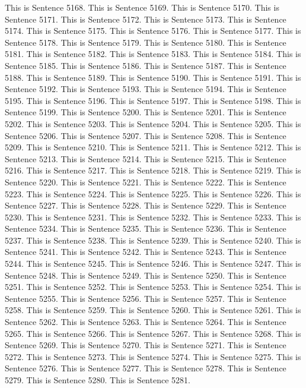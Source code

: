 \documentclass{article}
\begin{document}
This is Sentence 5168.
This is Sentence 5169.
This is Sentence 5170.
This is Sentence 5171.
This is Sentence 5172.
This is Sentence 5173.
This is Sentence 5174.
This is Sentence 5175.
This is Sentence 5176.
This is Sentence 5177.
This is Sentence 5178.
This is Sentence 5179.
This is Sentence 5180.
This is Sentence 5181.
This is Sentence 5182.
This is Sentence 5183.
This is Sentence 5184.
This is Sentence 5185.
This is Sentence 5186.
This is Sentence 5187.
This is Sentence 5188.
This is Sentence 5189.
This is Sentence 5190.
This is Sentence 5191.
This is Sentence 5192.
This is Sentence 5193.
This is Sentence 5194.
This is Sentence 5195.
This is Sentence 5196.
This is Sentence 5197.
This is Sentence 5198.
This is Sentence 5199.
This is Sentence 5200.
This is Sentence 5201.
This is Sentence 5202.
This is Sentence 5203.
This is Sentence 5204.
This is Sentence 5205.
This is Sentence 5206.
This is Sentence 5207.
This is Sentence 5208.
This is Sentence 5209.
This is Sentence 5210.
This is Sentence 5211.
This is Sentence 5212.
This is Sentence 5213.
This is Sentence 5214.
This is Sentence 5215.
This is Sentence 5216.
This is Sentence 5217.
This is Sentence 5218.
This is Sentence 5219.
This is Sentence 5220.
This is Sentence 5221.
This is Sentence 5222.
This is Sentence 5223.
This is Sentence 5224.
This is Sentence 5225.
This is Sentence 5226.
This is Sentence 5227.
This is Sentence 5228.
This is Sentence 5229.
This is Sentence 5230.
This is Sentence 5231.
This is Sentence 5232.
This is Sentence 5233.
This is Sentence 5234.
This is Sentence 5235.
This is Sentence 5236.
This is Sentence 5237.
This is Sentence 5238.
This is Sentence 5239.
This is Sentence 5240.
This is Sentence 5241.
This is Sentence 5242.
This is Sentence 5243.
This is Sentence 5244.
This is Sentence 5245.
This is Sentence 5246.
This is Sentence 5247.
This is Sentence 5248.
This is Sentence 5249.
This is Sentence 5250.
This is Sentence 5251.
This is Sentence 5252.
This is Sentence 5253.
This is Sentence 5254.
This is Sentence 5255.
This is Sentence 5256.
This is Sentence 5257.
This is Sentence 5258.
This is Sentence 5259.
This is Sentence 5260.
This is Sentence 5261.
This is Sentence 5262.
This is Sentence 5263.
This is Sentence 5264.
This is Sentence 5265.
This is Sentence 5266.
This is Sentence 5267.
This is Sentence 5268.
This is Sentence 5269.
This is Sentence 5270.
This is Sentence 5271.
This is Sentence 5272.
This is Sentence 5273.
This is Sentence 5274.
This is Sentence 5275.
This is Sentence 5276.
This is Sentence 5277.
This is Sentence 5278.
This is Sentence 5279.
This is Sentence 5280.
This is Sentence 5281.
\end{document}
